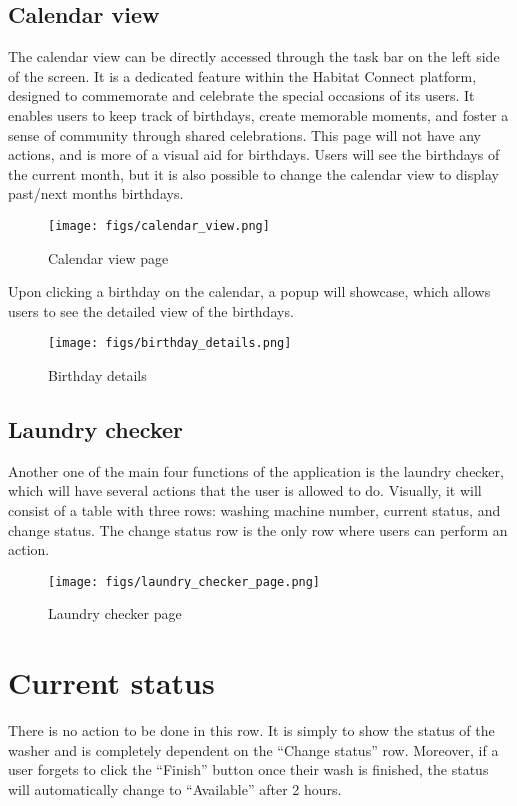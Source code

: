 \documentclass[conference]{IEEEtran}
\begin{document}
\subsection{Calendar view}
The calendar view can be directly accessed through the task bar on the left side of the screen. It is a dedicated feature within the Habitat Connect platform, designed to commemorate and celebrate the special occasions of its users. It enables users to keep track of birthdays, create memorable moments, and foster a sense of community through shared celebrations. This page will not have any actions, and is more of a visual aid for birthdays. Users will see the birthdays of the current month, but it is also possible to change the calendar view to display past/next months birthdays.
\begin{figure}[H]
\centering
\texttt{[image: figs/calendar\_view.png]}
\caption{Calendar view page}
\label{fig:Calendar view page}
\end{figure}
Upon clicking a birthday on the calendar, a popup will showcase, which allows users to see the detailed view of the birthdays.
\begin{figure}[H]
\centering
\texttt{[image: figs/birthday\_details.png]}
\caption{Birthday details}
\label{fig:Birthday details}
\end{figure}
\subsection{Laundry checker}
Another one of the main four functions of the application is the laundry checker, which will have several actions that the user is allowed to do. Visually, it will consist of a table with three rows: washing machine number, current status, and change status. The change status row is the only row where users can perform an action.
\begin{figure}[H]
\centering
\texttt{[image: figs/laundry\_checker\_page.png]}
\caption{Laundry checker page}
\label{fig:Laundry checker page}
\end{figure}
\section*{Current status}
There is no action to be done in this row. It is simply to show the status of the washer and is completely dependent on the “Change status” row. Moreover, if a user forgets to click the “Finish” button once their wash is finished, the status will automatically change to “Available” after 2 hours.
\end{document}
